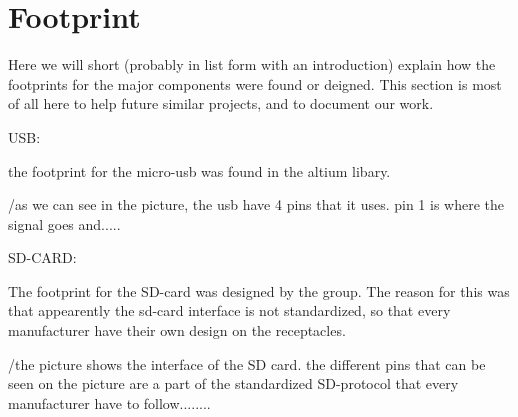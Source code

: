 \section {Footprint}

Here we will short (probably in list form with an introduction) explain how the footprints for the major components were found or deigned.
This section is most of all here to help future similar projects, and to document our work.

USB:

the footprint for the micro-usb was found in the altium libary. 


/as we can see in the picture, the usb have 4 pins that it uses. pin 1 is where the signal goes and.....

SD-CARD:

The footprint for the SD-card was designed by the group. The reason for this was that appearently the sd-card interface is not standardized, so that 
every manufacturer have their own design on the receptacles. 


/the picture shows the interface of the SD card. the different pins that can be seen on the picture are a part of the standardized SD-protocol that 
every manufacturer have to follow........
